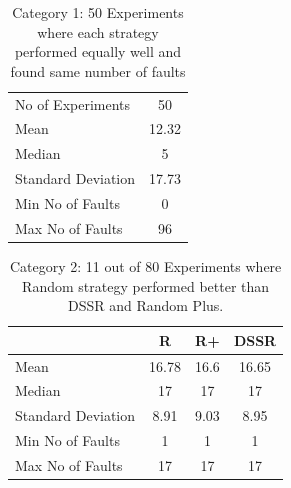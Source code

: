 \documentclass[conference]{IEEEtran}
\begin{document}



%
%

\begin{table}[H]
\caption{Category 1: 50 Experiments where each strategy performed equally well and found same number of faults}
\centering
\begin{tabular}{|l|c|}
\hline\hline
No of Experiments 	& 50  	\\
Mean  			& 12.32  	\\
Median 			& 5 		\\
Standard Deviation 	& 17.73  	\\
Min No of Faults	&  0  		\\
Max No of Faults 	& 96  	\\
\hline
\end{tabular}
\label{table:equal}
\end{table}






\begin{table}[H]
\caption{Category 2: 11 out of 80 Experiments where Random strategy performed better than DSSR and Random Plus.}
\centering
\begin{tabular}{|l|c|c|c|}
\hline\hline
 				& R			& R+				&  DSSR	\\
\hline
Mean  			&    16.78		&  16.6			&  16.65	\\
Median 			&    17    		&  17				&  17 	\\
Standard Deviation 	&    8.91		&  9.03			&  8.95	\\		
Min No of Faults	&    1			&  1				&  1\\
Max No of Faults 	&    17		&  17				& 17\\
\hline
\end{tabular}
\label{table:Randombetter}
\end{table}
\end{document}
